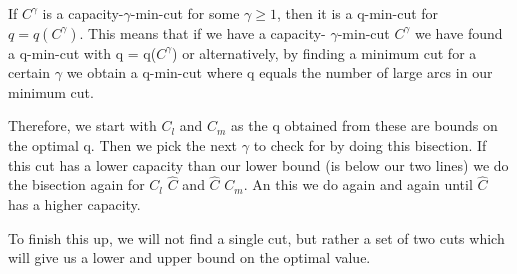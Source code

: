 \documentclass{article}
\begin{document}
If $C^\gamma$ is a capacity-$\gamma$-min-cut for some $\gamma \geq 1$, then it is a q-min-cut for $q = q(C^\gamma)$. This means that if we have a capacity-
$\gamma$-min-cut $C^\gamma$ we have found a q-min-cut with q = q($C^\gamma$) or alternatively, by finding a minimum cut for a certain $\gamma$ we obtain a q-min-cut 
where q equals the number of large arcs in our minimum cut. 

Therefore, we start with $C_l$ and $C_m$ as the q obtained from these are bounds on the optimal q. Then we pick the next $\gamma$ to check for by doing this 
bisection. If this cut has a lower capacity than our lower bound (is below our two lines) we do the bisection again for $C_l$ $\hat{C}$ and $\hat{C}$ $C_m$.
An this we do again and again until $\hat{C}$ has a higher capacity. 

To finish this up, we will not find a single cut, but rather a set of two cuts which will give us a lower and upper bound on the optimal value.
\end{document}
